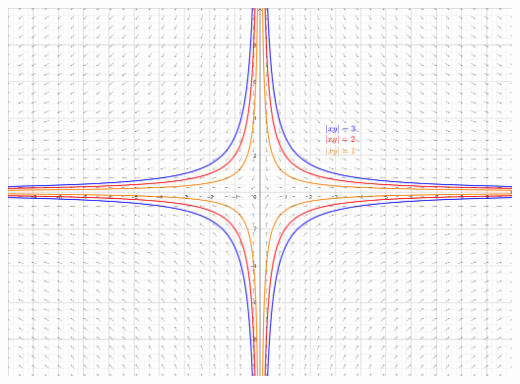 \documentclass{article}
\begin{document}
\begin{center}
    \includegraphics[scale=0.8]{Answer3.jpg}
\end{center}
\end{document}
